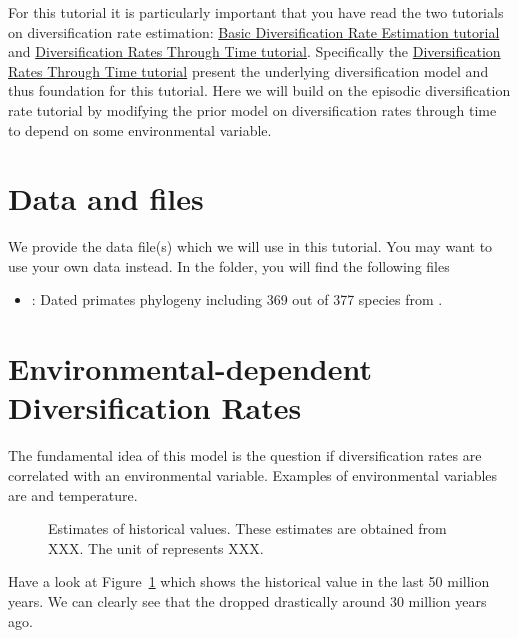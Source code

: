 For this tutorial it is particularly important that you have read the two tutorials on diversification rate estimation: \href{https://github.com/revbayes/revbayes_tutorial/raw/master/tutorial_TeX/RB_DiversificationRate_Tutorial/RB_DiversificationRate_Tutorial.pdf}{Basic Diversification Rate Estimation tutorial} and \href{https://github.com/revbayes/revbayes_tutorial/raw/master/tutorial_TeX/RB_DiversificationRate_Episodic_Tutorial/RB_DiversificationRate_Episodic_Tutorial.pdf}{Diversification Rates Through Time tutorial}.
Specifically the \href{https://github.com/revbayes/revbayes_tutorial/raw/master/tutorial_TeX/RB_DiversificationRate_Episodic_Tutorial/RB_DiversificationRate_Episodic_Tutorial.pdf}{Diversification Rates Through Time tutorial} present the underlying diversification model and thus foundation for this tutorial.
Here we will build on the episodic diversification rate tutorial by modifying the prior model on diversification rates through time to depend on some environmental variable.

\section{Data and files}

We provide the data file(s) which we will use in this tutorial.
You may want to use your own data instead.
In the  folder, you will find the following files
\begin{itemize}
\item {}: Dated primates phylogeny including 369 out of 377 species from \cite{Springer2012}.
\end{itemize}




\bigskip
\section{Environmental-dependent Diversification Rates}

The fundamental idea of this model is the question if diversification rates are correlated with an environmental variable.
Examples of environmental variables are \COO and temperature.
\begin{figure}[h!]
\centering
{}
\caption{\small Estimates of historical \COO values. These estimates are obtained from {\color{red}XXX}. The unit of \COO represents {\color{red}XXX}.}
\label{fig:CO2}
\end{figure}
Have a look at Figure~\ref{fig:CO2} which shows the historical value \COO in the last 50 million years.
We can clearly see that the \COO dropped drastically around 30 million years ago.

